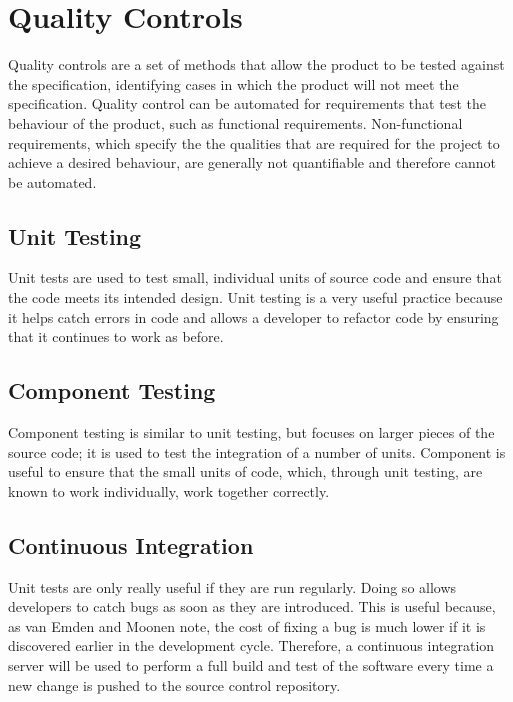 \section{Quality Controls}
\label{section:quality}

Quality controls are a set of methods that allow the product to be tested against the specification, identifying cases in which the product will not meet the specification.
Quality control can be automated for requirements that test the behaviour of the product, such as functional requirements. Non-functional requirements, which specify the the qualities that are required for the project to achieve a desired behaviour, are generally not quantifiable and therefore cannot be automated.



% 

\subsection{Unit Testing}
Unit tests are used to test small, individual units of source code and ensure that the
code meets its intended design. Unit testing is a very useful practice because it helps
catch errors in code and allows a developer to refactor code by ensuring that it continues
to work as before.


\subsection{Component Testing}
Component testing is similar to unit testing, but focuses on larger pieces of the source
code; it is used to test the integration of a number of units. Component is useful to
ensure that the small units of code, which, through unit testing, are known to work
individually, work together correctly.

\subsection{Continuous Integration}
Unit tests are only really useful if they are run regularly. Doing so allows developers
to catch bugs as soon as they are introduced. This is useful because, as van Emden
and Moonen note, the cost of fixing a bug is much lower if it is discovered earlier in
the development cycle.\cite{emden2002} Therefore, a continuous integration server
will be used to perform a full build and test of the software every time a new change
is pushed to the source control repository.

